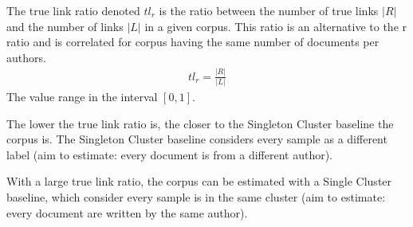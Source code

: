\begin{definition}
  The true link ratio denoted $tl_{r}$ is the ratio between the number of true links $|R|$ and the number of links $|L|$ in a given corpus.
  This ratio is an alternative to the r ratio and is correlated for corpus having the same number of documents per authors.
  \begin{gather*}
    tl_r = \frac{|R|}{|L|}
  \end{gather*}
  The value range in the interval $\left[0, 1\right]$.

  The lower the true link ratio is, the closer to the Singleton Cluster baseline the corpus is.
  The Singleton Cluster baseline considers every sample as a different label (aim to estimate: every document is from a different author).

  With a large true link ratio, the corpus can be estimated with a Single Cluster baseline, which consider every sample is in the same cluster (aim to estimate: every document are written by the same author).
\end{definition}
